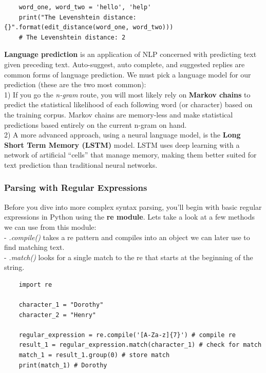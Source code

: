 \documentclass[11pt, a4paper]{article}
\begin{document}
\begin{spacing}{1.1}
\begin{lstlisting}
	word_one, word_two = 'hello', 'help'
	print("The Levenshtein distance: {}".format(edit_distance(word_one, word_two))) 
	# The Levenshtein distance: 2 \end{lstlisting} \newpage
	
	\noindent \textbf{Language prediction} is an application of NLP concerned with predicting text given preceding text. Auto-suggest, auto complete, and suggested replies are common forms of language prediction. We must pick a language model for our prediction (these are the two most common): \vspace*{1mm} \\
	1) If you go the \textit{n-gram} route, you will most likely rely on \textbf{Markov chains} to predict the statistical likelihood of each following word (or character) based on the training corpus. Markov chains are memory-less and make statistical predictions based entirely on the current n-gram on hand. \vspace*{1mm} \\
	2) A more advanced approach, using a neural language model, is the \textbf{Long Short Term Memory (LSTM)} model. LSTM uses deep learning with a network of artificial “cells” that manage memory, making them better suited for text prediction than traditional neural networks.
	\subsubsection{Parsing with Regular Expressions}
	Before you dive into more complex syntax parsing, you’ll begin with basic regular expressions in Python using the \textbf{re module}. Lets take a look at a few methods we can use from this module: \\
	\hspace*{2mm} - \textit{.compile()} takes a re pattern and compiles into an object we can later use to find matching text. \\
	\hspace*{2mm} - \textit{.match()} looks for a single match to the re that starts at the beginning of the string.
	\begin{lstlisting}
	import re
	
	character_1 = "Dorothy"
	character_2 = "Henry"
	
	regular_expression = re.compile('[A-Za-z]{7}') # compile re
	result_1 = regular_expression.match(character_1) # check for match
	match_1 = result_1.group(0) # store match
	print(match_1) # Dorothy
	

\end{lstlisting}
\end{spacing}
\end{document}
